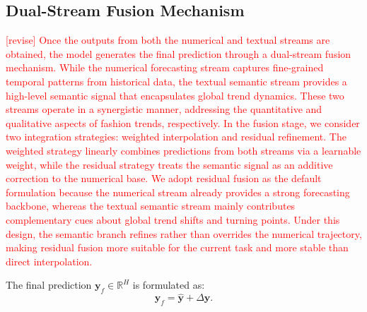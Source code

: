 \documentclass[Afour,sageh,times]{sagej}
\newcommand{\zhang}[1]{\textcolor{red}{[revise] #1}}
\begin{document}
{\subsection{Dual-Stream Fusion Mechanism} 
\zhang{Once the outputs from both the numerical and textual streams are obtained, the model generates the final prediction through a dual-stream fusion mechanism. While the numerical forecasting stream captures fine-grained temporal patterns from historical data, the textual semantic stream provides a high-level semantic signal that encapsulates global trend dynamics. These two streams operate in a synergistic manner, addressing the quantitative and qualitative aspects of fashion trends, respectively. In the fusion stage, we consider two integration strategies: weighted interpolation and residual refinement. The weighted strategy linearly combines predictions from both streams via a learnable weight, while the residual strategy treats the semantic signal as an additive correction to the numerical base. We adopt residual fusion as the default formulation because the numerical stream already provides a strong forecasting backbone, whereas the textual semantic stream mainly contributes complementary cues about global trend shifts and turning points. Under this design, the semantic branch refines rather than overrides the numerical trajectory, making residual fusion more suitable for the current task and more stable than direct interpolation.}

The final prediction $\mathbf{y}_f \in \mathbb{R}^H$ is formulated as:
\begin{equation}
\mathbf{y}_f = \hat{\mathbf{y}} + \Delta \mathbf{y}.
\end{equation}

}
\end{document}
